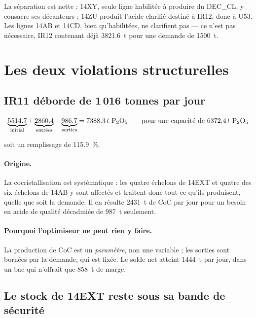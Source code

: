 La séparation est nette : 14XY, seule ligne habilitée à produire du DEC\_CL, y consacre ses
décanteurs ; 14ZU produit l'acide clarifié destiné à IR12, donc à U53. Les lignes 14AB et
14CD, bien qu'habilitées, ne clarifient pas --- ce n'est pas nécessaire, IR12 contenant déjà
\SI{3821,6}{\tonne} pour une demande de \SI{1500}{\tonne}.

\section{Les deux violations structurelles}

\subsection{IR11 déborde de 1\,016 tonnes par jour}

\begin{equation}
\underbrace{\num{5514,7}}_{\text{initial}} + \underbrace{\num{2860,4}}_{\text{entrées}} - \underbrace{\num{986,7}}_{\text{sorties}} = \num{7388,3}\,t~\mathrm{P_2O_5}
\qquad\text{pour une capacité de } \num{6372,4}\,t~\mathrm{P_2O_5}
\end{equation}

soit un remplissage de \SI{115,9}{\percent}.

\paragraph{Origine.} La cocristallisation est systématique : les quatre échelons de 14EXT et
quatre des six échelons de 14AB y sont affectés et traitent donc tout ce qu'ils produisent,
quelle que soit la demande. Il en résulte \SI{2431}{\tonne} de CoC par jour pour un besoin
en acide de qualité décadmiée de \SI{987}{\tonne} seulement.

\paragraph{Pourquoi l'optimiseur ne peut rien y faire.} La production de CoC est un
\emph{paramètre}, non une variable ; les sorties sont bornées par la demande, qui est fixée.
Le solde net atteint \SI{+1444}{\tonne} par jour, dans un bac qui n'offrait que
\SI{858}{\tonne} de marge.

\subsection{Le stock de 14EXT reste sous sa bande de sécurité}

